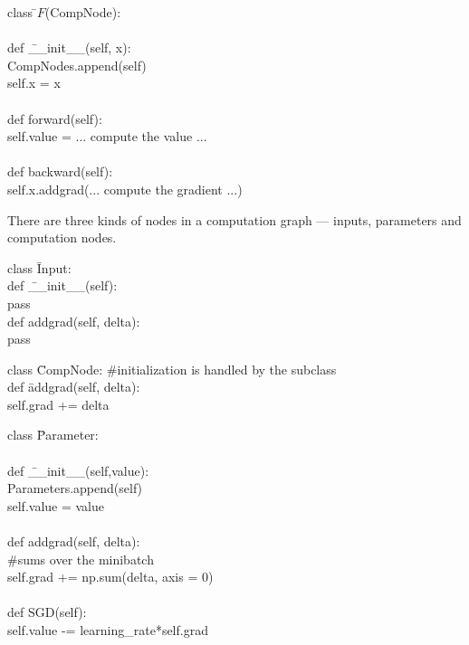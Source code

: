 {

\begin{tabbing}
  class \=$F$(CompNode): \\
  \\
    \>def \=\_\_init\_\_(self, x): \\
        \>\>CompNodes.append(self) \\
        \>\>self.x = x \\
\\
    \>def forward(self): \\
        \>\>self.value = ... compute the value ... \\
\\
    \>def backward(self): \\
        \>\>self.x.addgrad(... compute the gradient ...)
\end{tabbing}


There are three kinds of nodes in a computation graph --- inputs, parameters and computation nodes.

\vfill
\begin{tabbing}
class \=Input: \\
    \>def \=\_\_init\_\_(self): \\
        \>\>pass \\
    \>def \>addgrad(self, delta): \\
    \>\>pass
\end{tabbing}

\vfill
\begin{tabbing}
class \=CompNode: \#initialization is handled by the subclass \\
   \>def \=addgrad(self, delta): \\
   \>\>self.grad += delta
\end{tabbing}

\slide{}

\begin{tabbing}
class \=Parameter: \\
    \\
    \>def \=\_\_init\_\_(self,value): \\
        \>\>Parameters.append(self) \\
        \>\>self.value = value \\
\\
    \>def \>addgrad(self, delta): \\
          \>\>\#sums over the minibatch \\
    \>\>self.grad += np.sum(delta, axis = 0) \\
    \\
    \>def \>SGD(self): \\
    \>\>self.value -= learning\_rate*self.grad
\end{tabbing}

}
